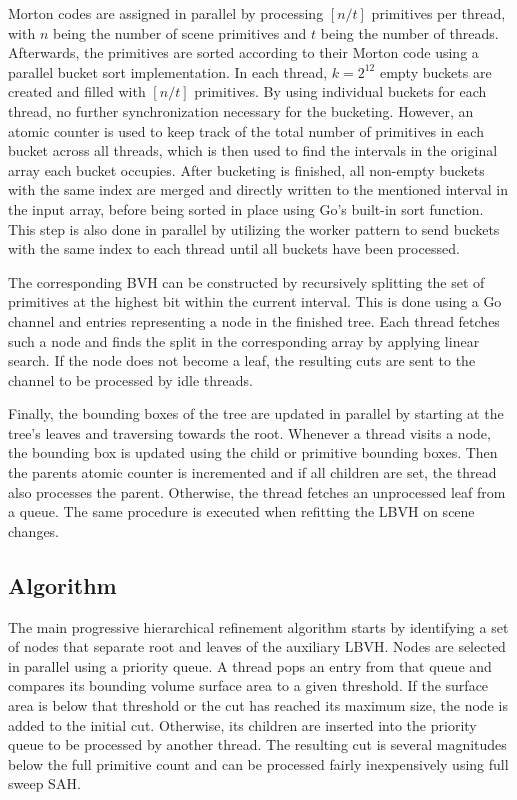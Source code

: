 Morton codes are assigned in parallel by processing $[n/t]$ primitives per thread, with $n$ being the number of scene primitives and $t$ being the number of threads. Afterwards, the primitives are sorted according to their Morton code using a parallel bucket sort implementation. In each thread, $k=2^{12}$ empty buckets are created and filled with $[n/t]$ primitives. By using individual buckets for each thread, no further synchronization necessary for the bucketing. However, an atomic counter is used to keep track of the total number of primitives in each bucket across all threads, which is then used to find the intervals in the original array each bucket occupies. After bucketing is finished, all non-empty buckets with the same index are merged and directly written to the mentioned interval in the input array, before being sorted in place using Go's built-in sort function. This step is also done in parallel by utilizing the worker pattern to send buckets with the same index to each thread until all buckets have been processed.

The corresponding BVH can be constructed by recursively splitting the set of primitives at the highest bit within the current interval. This is done using a Go channel and entries representing a node in the finished tree. Each thread fetches such a node and finds the split in the corresponding array by applying linear search. If the node does not become a leaf, the resulting cuts are sent to the channel to be processed by idle threads.

Finally, the bounding boxes of the tree are updated in parallel by starting at the tree's leaves and traversing towards the root. Whenever a thread visits a node, the bounding box is updated using the child or primitive bounding boxes. Then the parents atomic counter is incremented and if all children are set, the thread also processes the parent. Otherwise, the thread fetches an unprocessed leaf from a queue. The same procedure is executed when refitting the LBVH on scene changes. 
\subsection{Algorithm}
\label{phr_algorithm}
The main progressive hierarchical refinement algorithm starts by identifying a set of nodes that separate root and leaves of the auxiliary LBVH. Nodes are selected in parallel using a priority queue. A thread pops an entry from that queue and compares its bounding volume surface area to a given threshold. If the surface area is below that threshold or the cut has reached its maximum size, the node is added to the initial cut. Otherwise, its children are inserted into the priority queue to be processed by another thread. The resulting cut is several magnitudes below the full primitive count and can be processed fairly inexpensively using full sweep SAH.

